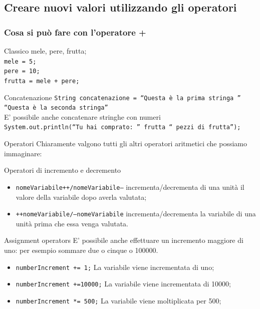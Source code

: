 \subsection*{Creare nuovi valori utilizzando gli operatori}
\begin{frame}
\frametitle{Cosa si può fare con l'operatore \alert{+}}
\begin{block}{Classico}\footnotesize
\texttt{} mele, pere, frutta;\\
\texttt{mele = 5;}\\
\texttt{pere = 10;}\\
\texttt{frutta = mele + pere;}\\
\end{block}
\pause
\begin{block}{Concatenazione}\footnotesize
\texttt{String concatenazione = ``Questa è la prima stringa ''\textCl{+} ``Questa è la seconda stringa''}\\
E' possibile anche concatenare stringhe con numeri\\
\texttt{System.out.println(``Tu hai comprato: ''\textCl{+} frutta \textCl{+}`` pezzi di frutta'');}
\end{block}
\pause
\begin{block}{Operatori}
Chiaramente valgono tutti gli altri operatori aritmetici che possiamo immaginare: \textCl{- * / \%}
\end{block}
\end{frame}

\begin{frame}
\begin{block}{Operatori di incremento e decremento}
\begin{itemize}
\item \texttt{nomeVariabile++/nomeVariabile--} incrementa/decrementa di una unità il valore della variabile dopo averla valutata;
\item \texttt{++nomeVariabile/--nomeVariabile} incrementa/decrementa la variabile di una unità prima che essa venga valutata.
\end{itemize}
\end{block}
\begin{block}{Assignment operators}
E' possibile anche effettuare un incremento maggiore di uno: per esempio sommare due o cinque o 100000.
\begin{itemize}
\item \texttt{numberIncrement += 1;} La variabile viene incrementata di uno;
\item \texttt{numberIncrement +=10000;} La variabile viene incrementata di 10000;
\item \texttt{numberIncrement *= 500;} La variabile viene moltiplicata per 500;
\end{itemize}
\end{block}
\end{frame}

